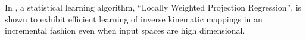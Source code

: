 In \cite{973374},   a statistical learning algorithm, ``Locally Weighted Projection Regression'', is shown to exhibit efficient learning of inverse kinematic mappings in an incremental fashion even when input spaces are high dimensional.




%

